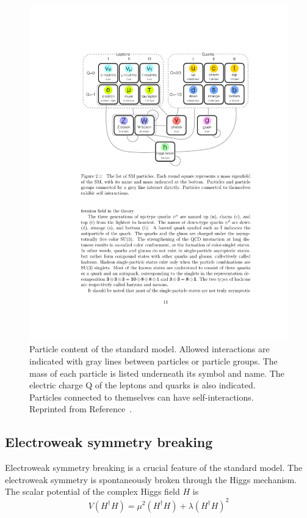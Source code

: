 \begin{figure}[htbp]
    \centering
    \includegraphics[width=\textwidth]{Figures/Theory/SM_Interactions.pdf}
    \caption{Particle content of the standard model. Allowed interactions are indicated with gray lines between particles or particle groups. The mass of each particle is listed underneath its symbol and name. The electric charge Q of the leptons and quarks is also indicated. Particles connected to themselves can have self-interactions.
    Reprinted from Reference~\cite{Yutaro}.}
    \label{fig:SMint}
\end{figure}


\subsection{Electroweak symmetry breaking}
\label{sec:EWSB}
Electroweak symmetry breaking is a crucial feature of the standard model. The electroweak symmetry is spontaneously broken through the Higgs mechanism. 
The scalar potential of the complex Higgs field $H$ is
\begin{equation}
V(H^\dagger H) =  \mu^2(H^\dagger H) + \lambda(H^\dagger H)^2
\label{equ:HiggsV}
\end{equation}

